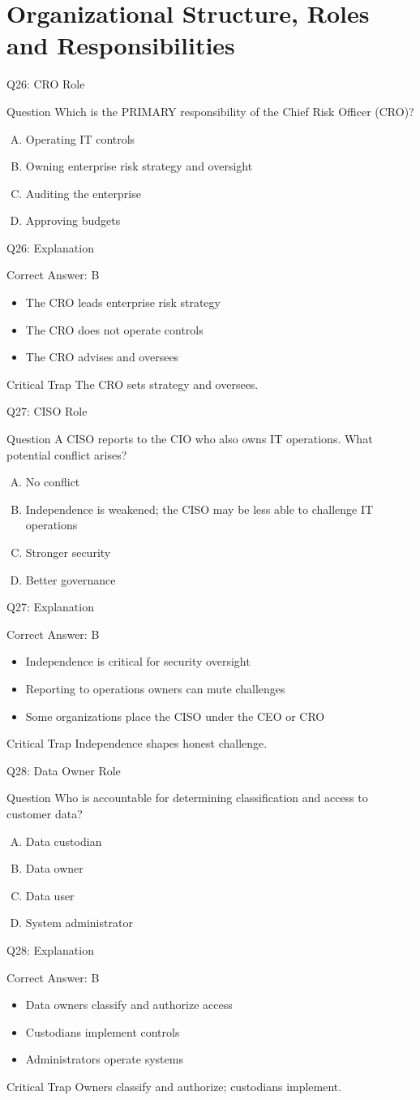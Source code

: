 \documentclass[aspectratio=169]{beamer}
\newcommand{\hq}[7]{%
	\begin{frame}{Q#1: #2}
		\begin{block}{Question}
			#3
		\end{block}
		\begin{enumerate}[(A)]
			#4
		\end{enumerate}
	\end{frame}
	\begin{frame}{Q#1: Explanation}
		\begin{block}{Correct Answer: #5}
			\begin{itemize}
				#6
			\end{itemize}
		\end{block}
		\begin{alertblock}{Critical Trap}
			#7
		\end{alertblock}
	\end{frame}
}
\begin{document}
	\section{Organizational Structure, Roles and Responsibilities}
	
	\hq{26}{CRO Role}
	{Which is the PRIMARY responsibility of the Chief Risk Officer (CRO)?}
	{\item Operating IT controls
		\item Owning enterprise risk strategy and oversight
		\item Auditing the enterprise
		\item Approving budgets}
	{B}
	{\item The CRO leads enterprise risk strategy
		\item The CRO does not operate controls
		\item The CRO advises and oversees}
	{The CRO sets strategy and oversees.}
	
	\hq{27}{CISO Role}
	{A CISO reports to the CIO who also owns IT operations. What potential conflict arises?}
	{\item No conflict
		\item Independence is weakened; the CISO may be less able to challenge IT operations
		\item Stronger security
		\item Better governance}
	{B}
	{\item Independence is critical for security oversight
		\item Reporting to operations owners can mute challenges
		\item Some organizations place the CISO under the CEO or CRO}
	{Independence shapes honest challenge.}
	
	\hq{28}{Data Owner Role}
	{Who is accountable for determining classification and access to customer data?}
	{\item Data custodian
		\item Data owner
		\item Data user
		\item System administrator}
	{B}
	{\item Data owners classify and authorize access
		\item Custodians implement controls
		\item Administrators operate systems}
	{Owners classify and authorize; custodians implement.}
	
\end{document}
